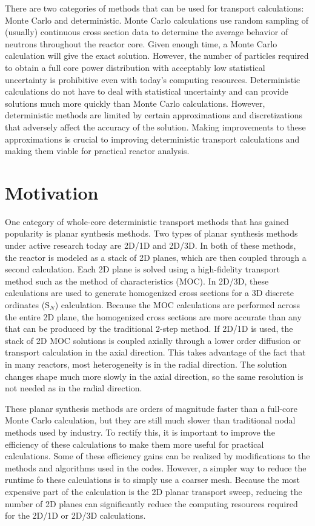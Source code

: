 There are two categories of methods that can be used for transport calculations: Monte Carlo and deterministic.  Monte Carlo calculations use random sampling of (usually) continuous cross section data to determine the average behavior of neutrons throughout the reactor core.  Given enough time, a Monte Carlo calculation will give the exact solution.  However, the number of particles required to obtain a full core power distribution with acceptably low statistical uncertainty is prohibitive even with today's computing resources.  Deterministic calculations do not have to deal with statistical uncertainty and can provide solutions much more quickly than Monte Carlo calculations.  However, deterministic methods are limited by certain approximations and discretizations that adversely affect the accuracy of the solution.  Making improvements to these approximations is crucial to improving deterministic transport calculations and making them viable for practical reactor analysis.

\section{Motivation}

One category of whole-core deterministic transport methods that has gained popularity is planar synthesis methods.  Two types of planar synthesis methods under active research today are 2D/1D and 2D/3D.  In both of these methods, the reactor is modeled as a stack of 2D planes, which are then coupled through a second calculation.  Each 2D plane is solved using a high-fidelity transport method such as the method of characteristics (MOC).  In 2D/3D, these calculations are used to generate homogenized cross sections for a 3D discrete ordinates (S$_N$) calculation.  Because the MOC calculations are performed across the entire 2D plane, the homogenized cross sections are more accurate than any that can be produced by the traditional 2-step method.  If 2D/1D is used, the stack of 2D MOC solutions is coupled axially through a lower order diffusion or transport calculation in the axial direction.  This takes advantage of the fact that in many reactors, most heterogeneity is in the radial direction.  The solution changes shape much more slowly in the axial direction, so the same resolution is not needed as in the radial direction.

These planar synthesis methods are orders of magnitude faster than a full-core Monte Carlo calculation, but they are still much slower than traditional nodal methods used by industry.  To rectify this, it is important to improve the efficiency of these calculations to make them more useful for practical calculations.  Some of these efficiency gains can be realized by modifications to the methods and algorithms used in the codes.  However, a simpler way to reduce the runtime fo these calculations is to simply use a coarser mesh.  Because the most expensive part of the calculation is the 2D planar transport sweep, reducing the number of 2D planes can significantly reduce the computing resources required for the 2D/1D or 2D/3D calculations.

